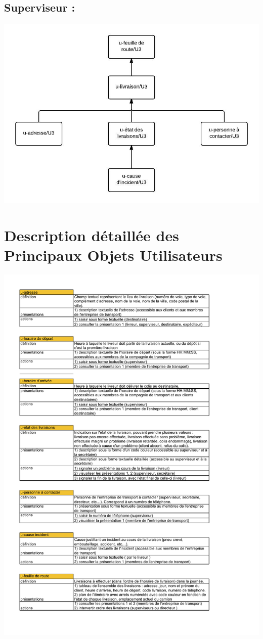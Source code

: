 \documentclass{report}
\begin{document}
\subsection{Superviseur  : }
\includegraphics[scale = 0.4]{images/MSIHM-U3.jpeg}

\section{Description détaillée des Principaux Objets Utilisateurs}

\includegraphics[scale = 0.8, page = 1]{images/DPOU.pdf} 
\end{document}
